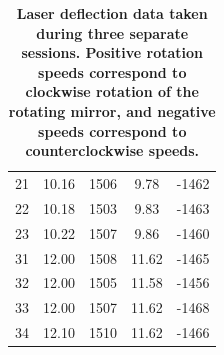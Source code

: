 \documentclass[twocolumn]{article}
\begin{document}
\begin{table}[]
\begin{tabular}{c|c c c c}
				21       & 10.16                                                          & 1506                                                        & 9.78                                                            & -1462                                                        \\
				22       & 10.18                                                          & 1503                                                        & 9.83                                                            & -1463                                                        \\
				23       & 10.22                                                          & 1507                                                        & 9.86                                                            & -1460                                                        \\ 
				31       & 12.00                                                          & 1508                                                        & 11.62                                                           & -1465                                                        \\
				32       & 12.00                                                          & 1505                                                        & 11.58                                                           & -1456                                                        \\
				33       & 12.00                                                          & 1507                                                        & 11.62                                                           & -1468                                                        \\
				34       & 12.10                                                          & 1510                                                        & 11.62                                                           & -1466  \\                                                  
			\end{tabular}
			\caption{\textbf{Laser deflection data taken during three separate sessions. Positive rotation speeds correspond to clockwise rotation of the rotating mirror, and negative speeds correspond to counterclockwise speeds.}}
			\label{tab:rawmeasure}
		\end{table}
		
		
		
\end{document}
